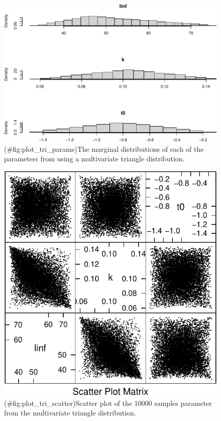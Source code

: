 \documentclass[
]{book}
\begin{document}
\begin{figure}
\centering
\includegraphics{_main_files/figure-latex/plot_tri_params-1.pdf}
\caption{(\#fig:plot\_tri\_params)The marginal distributions of each of the parameters from using a multivariate triangle distribution.}
\end{figure}

\begin{figure}
\centering
\includegraphics{_main_files/figure-latex/plot_tri_scatter-1.pdf}
\caption{(\#fig:plot\_tri\_scatter)Scatter plot of the 10000 samples parameter from the multivariate triangle distribution.}
\end{figure}
\end{document}
